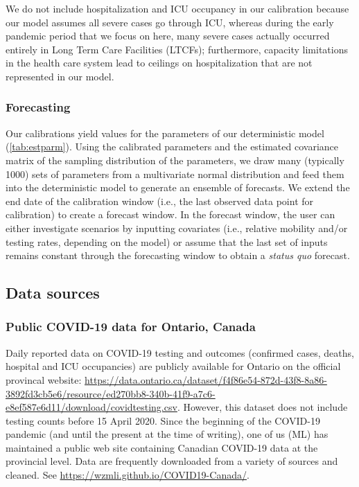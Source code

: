 \documentclass[12pt]{article}\usepackage[]{graphicx}\usepackage[]{color}
\begin{document}
\begin{table}
  \centering
  
  \label{tab:litparm}
\end{table}

We do not include hospitalization and ICU occupancy in our calibration because our model assumes all severe cases go through ICU, whereas during the early pandemic period
that we focus on here, many severe cases actually occurred entirely in Long Term Care Facilities (LTCFs); furthermore, capacity limitations in the health care system lead to ceilings on hospitalization that are
not represented in our model.

\subsubsection*{Forecasting}

Our calibrations yield values for the parameters of our deterministic model (\cref{tab:estparm}).
Using the calibrated parameters and the estimated covariance matrix of the sampling distribution of the parameters, we draw many (typically 1000) sets of parameters from a multivariate normal distribution \cite{Bolk08,krinskyThree1991a} and feed them into the deterministic model to generate an ensemble of forecasts. We extend the end date of the calibration window (i.e., the last observed data point for calibration) to create a forecast window. In the forecast window, the user can either investigate scenarios by inputting covariates (i.e., relative mobility and/or testing rates, depending on the model) or assume that the last set of inputs remains constant through the forecasting window to obtain a
\emph{status quo} forecast.

\subsection{Data sources}

\subsubsection*{Public COVID-19 data for Ontario, Canada}

Daily reported data on COVID-19 testing and outcomes (confirmed cases, deaths, hospital and ICU occupancies) are publicly available for Ontario on the official provincal website:
\url{https://data.ontario.ca/dataset/f4f86e54-872d-43f8-8a86-3892fd3cb5e6/resource/ed270bb8-340b-41f9-a7c6-e8ef587e6d11/download/covidtesting.csv}.
However, this dataset does not include testing counts before 15 April 2020.  Since the beginning of the COVID-19 pandemic (and until the present at the time of writing), one of us (ML) has maintained a public web site containing Canadian COVID-19 data at the provincial level.  Data are frequently downloaded from a variety of sources and cleaned.  See \url{https://wzmli.github.io/COVID19-Canada/}.
\end{document}
